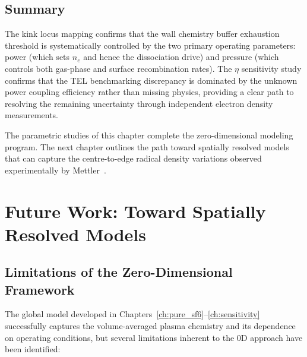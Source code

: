 \documentclass[11pt,a4paper]{report}
\begin{document}
\section{Summary}
\label{sec:sens_summary}

The kink locus mapping confirms that the wall chemistry buffer exhaustion threshold is systematically controlled by the two primary operating parameters: power (which sets $n_e$ and hence the dissociation drive) and pressure (which controls both gas-phase and surface recombination rates).  The $\eta$ sensitivity study confirms that the TEL benchmarking discrepancy is dominated by the unknown power coupling efficiency rather than missing physics, providing a clear path to resolving the remaining uncertainty through independent electron density measurements.

The parametric studies of this chapter complete the zero-dimensional modeling program.  The next chapter outlines the path toward spatially resolved models that can capture the centre-to-edge radical density variations observed experimentally by Mettler~\cite{Mettler2025}.


\chapter{Future Work: Toward Spatially Resolved Models}
\label{ch:future}

\section{Limitations of the Zero-Dimensional Framework}
\label{sec:future_limitations}

The global model developed in Chapters~\ref{ch:pure_sf6}--\ref{ch:sensitivity} successfully captures the volume-averaged plasma chemistry and its dependence on operating conditions, but several limitations inherent to the 0D approach have been identified:
\end{document}
